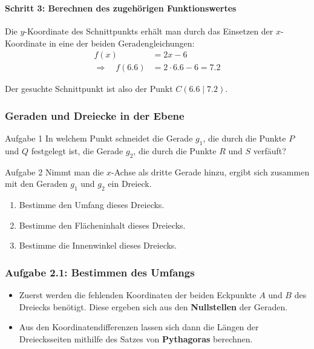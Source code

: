 \documentclass
[
  fontsize = 10pt,
  compress = true,
  ngerman,
  dvipsnames
]
{beamer}
\begin{document}
\begin{frame}
  \frametitle{\sectiontitle}
  \framesubtitle{Schritt 3: Berechnen des zugehörigen Funktionswertes}
  Die $y$-Koordinate des Schnittpunkts erhält man durch das
  Einsetzen der $x$-Koordinate in eine der beiden Geradengleichungen:
  \begin{equation*}
    \begin{split}
      f(x)&=2x-6 \\
      \Rightarrow\quad
      f(\num{6.6})&=2\cdot\num{6.6}-6=\num{7.2}
    \end{split}
  \end{equation*}
  
  \pause

  Der gesuchte Schnittpunkt ist also der Punkt $C(\num{6.6}\mid\num{7.2})$.
\end{frame}

\begin{frame}
  \frametitle{Geraden und Dreiecke in der Ebene}
  \begin{block}{Aufgabe 1}
    In welchem Punkt schneidet die Gerade $g_1$, die durch die Punkte $P$
    und $Q$ festgelegt ist, die Gerade $g_2$, die durch die Punkte $R$ und
    $S$ verfäuft?
  \end{block}
  \begin{block}{Aufgabe 2}
    Nimmt man die $x$-Achse als dritte Gerade hinzu, ergibt sich zusammen
    mit den Geraden $g_1$ und $g_2$ ein Dreieck.
    \begin{enumerate}[{2}.1]
      \item Bestimme den Umfang dieses Dreiecks.
      \item Bestimme den Flächeninhalt dieses Dreiecks.
      \item Bestimme die Innenwinkel dieses Dreiecks.
    \end{enumerate}
  \end{block}
\end{frame}

\renewcommand{\sectiontitle}{Aufgabe 2.1: Bestimmen des Umfangs}

\begin{frame}
  \frametitle{\sectiontitle}
  \begin{itemize}
    \item Zuerst werden die fehlenden Koordinaten der beiden Eckpunkte
          $A$ und $B$ des Dreiecks benötigt. Diese ergeben sich aus den
          \textbf{Nullstellen} der Geraden.
    \item Aus den Koordinatendifferenzen lassen sich dann die Längen der
          Dreiecksseiten mithilfe des Satzes von \textbf{Pythagoras}
          berechnen.
  \end{itemize}
\end{frame}
\end{document}
